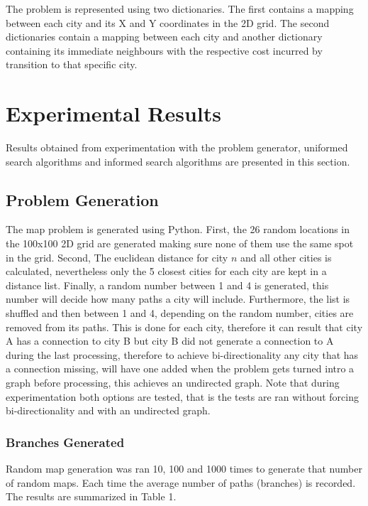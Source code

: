 \documentclass[12pt, letter]{article}
\begin{document}
The problem is represented using two dictionaries. The first contains a mapping between each city and its X and Y coordinates in the 2D grid. The second dictionaries contain a mapping between each city and another dictionary containing its immediate neighbours with the respective cost incurred by transition to that specific city. 

\section{Experimental Results}

Results obtained from experimentation with the problem generator, uniformed search algorithms and informed search algorithms are presented in this section. 

\subsection{Problem Generation}

The map problem is generated using Python. First, the 26 random locations in the 100x100 2D grid are generated making sure none of them use the same spot in the grid. Second, The euclidean distance for city $n$ and all other cities is calculated, nevertheless only the 5 closest cities for each city are kept in a distance list. Finally, a random number between 1 and 4 is generated, this number will decide how many paths a city will include. Furthermore, the list is shuffled and then between 1 and 4, depending on the random number, cities are removed from its paths. This is done for each city, therefore it can result that city A has a connection to city B but city B did not generate a connection to A during the last processing, therefore to achieve bi-directionality any city that has a connection missing, will have one added when the problem gets turned intro a graph before processing, this achieves an undirected graph. Note that during experimentation both options are tested, that is the tests are ran without forcing bi-directionality and with an undirected graph. 

\subsubsection{Branches Generated}

Random map generation was ran 10, 100 and 1000 times to generate that number of random maps. Each time the average number of paths (branches) is recorded. The results are summarized in Table 1.
\end{document}
